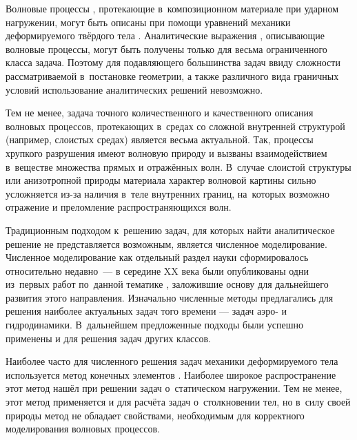 \documentclass[thesis.tex]{subfiles}
\begin{document}
Волновые процессы \cite{лурье1955пространственные,бреховских1973волны}, протекающие в~композиционном материале при
ударном нагружении, могут быть описаны при помощи уравнений механики деформируемого твёрдого тела
\cite{лехницкий1977теория}. Аналитические выражения \cite{Zhupanska2010indentation,shahid1993progressive}, описывающие
волновые процессы, могут быть получены только для весьма ограниченного класса задача. Поэтому для подавляющего
большинства задач ввиду сложности рассматриваемой в~постановке геометрии, а также различного вида граничных условий
использование аналитических решений невозможно.

Тем не менее, задача точного количественного и качественного описания волновых процессов, протекающих в~средах со
сложной внутренней структурой (например, слоистых средах) является весьма актуальной. Так, процессы хрупкого разрушения
имеют волновую природу и вызваны взаимодействием в~веществе множества прямых и отражённых волн. В~случае слоистой
структуры или анизотропной природы материала характер волновой картины сильно усложняется из-за наличия в~теле
внутренних границ, на~которых возможно отражение и преломление распространяющихся волн.

Традиционным подходом к~решению задач, для которых найти аналитическое решение не представляется возможным, является
численное моделирование. Численное моделирование как отдельный раздел науки сформировалось относительно недавно~--- в
середине XX века были опубликованы одни из~первых работ по~данной тематике \cite{crank1947practical,vonneumann1950method,courant1952solution,lax1954weak,лебедев1955уравнения,рябенький1956устойчивость,годунов1957разностный,дородницын1958один,владимиров1958численное,белоцерковский1958расчёт,федоренко1962применение,ландау1958чтсленные,lax1960system,тихонов1961однородные},
заложившие основу для дальнейшего развития этого направления. Изначально численные методы предлагались для решения
наиболее актуальных задач того времени --- задач аэро- и гидродинамики. В~дальнейшем предложенные подходы были
успешно применены и для решения задач других классов.

Наиболее часто для численного решения задач механики деформируемого тела используется \cite{bermudez1999finite}
метод конечных элементов \cite{морозов2008метод,партон2007механика}. Наиболее широкое распространение этот метод нашёл
при решении задач о~статическом нагружении. Тем не менее, этот метод применяется \cite{johnson1977high} и для расчёта
задач о~столкновении тел, но в~силу своей природы метод не обладает свойствами, необходимым для корректного
моделирования волновых процессов.
\end{document}
